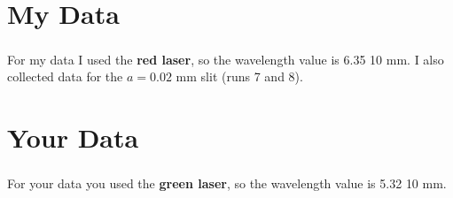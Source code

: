\section{My Data}
%
For my data I used the \textbf{red laser}, so the wavelength value is 6.35{ }\texttimes{ }10\textsuperscript{} mm. I also collected data for the $a = 0.02$ mm slit (runs 7 and 8).
%
\section{Your Data}
%
For your data you used the \textbf{green laser}, so the wavelength value is 5.32{ }\texttimes{ }10\textsuperscript{} mm.
%
%
\newpage
